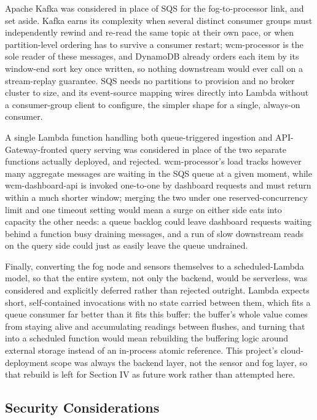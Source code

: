 \documentclass[conference,a4paper]{IEEEtran}
\begin{document}
Apache Kafka was considered in place of SQS for the fog-to-processor link, and set aside. Kafka earns its complexity when several distinct consumer groups must independently rewind and re-read the same topic at their own pace, or when partition-level ordering has to survive a consumer restart; wcm-processor is the sole reader of these messages, and DynamoDB already orders each item by its window-end sort key once written, so nothing downstream would ever call on a stream-replay guarantee. SQS needs no partitions to provision and no broker cluster to size, and its event-source mapping wires directly into Lambda without a consumer-group client to configure, the simpler shape for a single, always-on consumer.

A single Lambda function handling both queue-triggered ingestion and API-Gateway-fronted query serving was considered in place of the two separate functions actually deployed, and rejected. wcm-processor's load tracks however many aggregate messages are waiting in the SQS queue at a given moment, while wcm-dashboard-api is invoked one-to-one by dashboard requests and must return within a much shorter window; merging the two under one reserved-concurrency limit and one timeout setting would mean a surge on either side eats into capacity the other needs: a queue backlog could leave dashboard requests waiting behind a function busy draining messages, and a run of slow downstream reads on the query side could just as easily leave the queue undrained.

Finally, converting the fog node and sensors themselves to a scheduled-Lambda model, so that the entire system, not only the backend, would be serverless, was considered and explicitly deferred rather than rejected outright. Lambda expects short, self-contained invocations with no state carried between them, which fits a queue consumer far better than it fits this buffer: the buffer's whole value comes from staying alive and accumulating readings between flushes, and turning that into a scheduled function would mean rebuilding the buffering logic around external storage instead of an in-process atomic reference. This project's cloud-deployment scope was always the backend layer, not the sensor and fog layer, so that rebuild is left for Section IV as future work rather than attempted here.

\subsection{Security Considerations}
\end{document}
